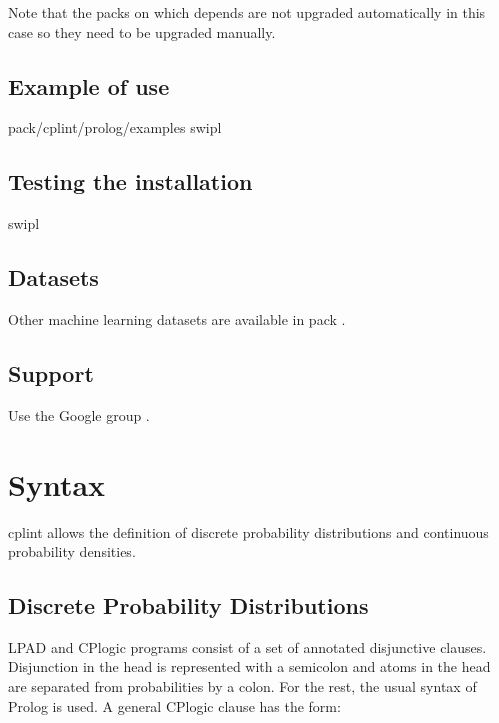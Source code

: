 \documentclass[letterpaper,10pt,english]{sphinxmanual}
\begin{document}
\sphinxAtStartPar
Note that the packs on which  depends are not upgraded automatically in this case so they need to be upgraded manually.


\section{Example of use}
\label{\detokenize{index:example-of-use}}
\begin{sphinxVerbatim}[commandchars=\\\{\}]
 \PYGZlt{}pack\PYGZgt{}/cplint/prolog/examples
swipl
\end{sphinxVerbatim}


\section{Testing the installation}
\label{\detokenize{index:testing-the-installation}}
\begin{sphinxVerbatim}[commandchars=\\\{\}]
swipl
\end{sphinxVerbatim}


\section{Datasets}
\label{\detokenize{index:datasets}}
\sphinxAtStartPar
Other machine learning datasets are available in pack .


\section{Support}
\label{\detokenize{index:support}}
\sphinxAtStartPar
Use the Google group .


\chapter{Syntax}
\label{\detokenize{index:syntax}}
\sphinxAtStartPar
cplint allows the definition of discrete probability distributions and continuous probability densities.


\section{Discrete Probability Distributions}
\label{\detokenize{index:discrete-probability-distributions}}
\sphinxAtStartPar
LPAD and CP\sphinxhyphen{}logic programs consist of a set of annotated disjunctive clauses.
Disjunction in the head is represented with a semicolon and atoms in the head are separated from probabilities by a colon.
For the rest, the usual syntax of Prolog is used.
A general CP\sphinxhyphen{}logic clause has the form:
\end{document}
